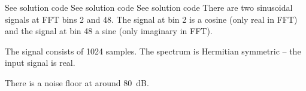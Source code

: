 \begin{solution}
	\begin{tasks}
		\task
		See solution code
		\task
		See solution code
		\task
		See solution code
		\task
		There are two sinusoidal signals at FFT bins 2 and 48. The signal at bin 2 is a cosine (only real in FFT) and the signal at bin 48 a sine (only imaginary in FFT).
		
		The signal consists of 1024 samples. The spectrum is Hermitian symmetric -- the input signal is real.
		
		There is a noise floor at around \SI{80}{dB}.
	\end{tasks}
\end{solution}

%
